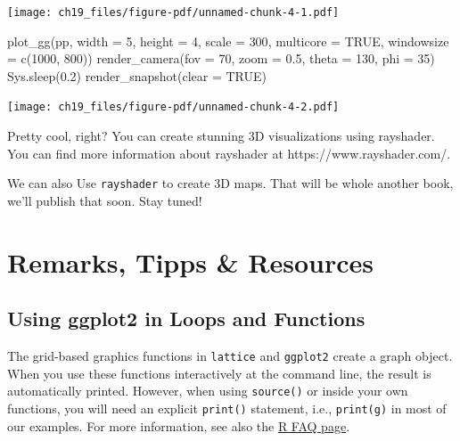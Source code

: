 \documentclass[
  letterpaper,
  DIV=11,
  numbers=noendperiod]{scrreprt}
\newenvironment{Shaded}{\begin{snugshade}}{\end{snugshade}}
\newcommand{\AttributeTok}[1]{\textcolor[rgb]{0.40,0.45,0.13}{#1}}
\newcommand{\ConstantTok}[1]{\textcolor[rgb]{0.56,0.35,0.01}{#1}}
\newcommand{\DecValTok}[1]{\textcolor[rgb]{0.68,0.00,0.00}{#1}}
\newcommand{\FloatTok}[1]{\textcolor[rgb]{0.68,0.00,0.00}{#1}}
\newcommand{\FunctionTok}[1]{\textcolor[rgb]{0.28,0.35,0.67}{#1}}
\newcommand{\NormalTok}[1]{\textcolor[rgb]{0.00,0.23,0.31}{#1}}
\begin{document}
\texttt{[image: ch19\_files/figure-pdf/unnamed-chunk-4-1.pdf]}

\begin{Shaded}
\begin{Highlighting}[]
\FunctionTok{plot\_gg}\NormalTok{(pp, }\AttributeTok{width =} \DecValTok{5}\NormalTok{, }\AttributeTok{height =} \DecValTok{4}\NormalTok{, }\AttributeTok{scale =} \DecValTok{300}\NormalTok{, }\AttributeTok{multicore =} \ConstantTok{TRUE}\NormalTok{, }\AttributeTok{windowsize =} \FunctionTok{c}\NormalTok{(}\DecValTok{1000}\NormalTok{, }\DecValTok{800}\NormalTok{))}
\FunctionTok{render\_camera}\NormalTok{(}\AttributeTok{fov =} \DecValTok{70}\NormalTok{, }\AttributeTok{zoom =} \FloatTok{0.5}\NormalTok{, }\AttributeTok{theta =} \DecValTok{130}\NormalTok{, }\AttributeTok{phi =} \DecValTok{35}\NormalTok{)}
\FunctionTok{Sys.sleep}\NormalTok{(}\FloatTok{0.2}\NormalTok{)}
\FunctionTok{render\_snapshot}\NormalTok{(}\AttributeTok{clear =} \ConstantTok{TRUE}\NormalTok{)}
\end{Highlighting}
\end{Shaded}

\texttt{[image: ch19\_files/figure-pdf/unnamed-chunk-4-2.pdf]}

Pretty cool, right? You can create stunning 3D visualizations using
rayshader. You can find more information about rayshader at
https://www.rayshader.com/.

We can also Use \texttt{rayshader} to create 3D maps. That will be whole
another book, we'll publish that soon. Stay tuned!


\chapter*{Remarks, Tipps \& Resources}\label{remarks-tipps-resources}


\section*{Using ggplot2 in Loops and
Functions}\label{using-ggplot2-in-loops-and-functions}


The grid-based graphics functions in \texttt{lattice} and
\texttt{ggplot2} create a graph object. When you use these functions
interactively at the command line, the result is automatically printed.
However, when using \texttt{source()} or inside your own functions, you
will need an explicit \texttt{print()} statement, i.e.,
\texttt{print(g)} in most of our examples. For more information, see
also the
\href{https://cran.r-project.org/doc/FAQ/R-FAQ.html\#Why-do-lattice_002ftrellis-graphics-not-work_003f}{R
FAQ page}.
\end{document}
